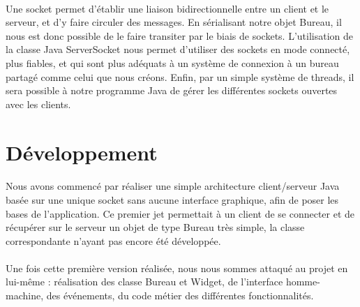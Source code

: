 \paragraph{}
Une socket permet d'établir une liaison bidirectionnelle entre un client et le serveur, et d'y faire circuler des messages. En sérialisant notre objet Bureau, il nous est donc possible de le faire transiter par le biais de sockets. L'utilisation de la classe Java ServerSocket nous permet d'utiliser des sockets en mode connecté, plus fiables, et qui sont plus adéquats à un système de connexion à un bureau partagé comme celui que nous créons. Enfin, par un simple système de threads, il sera possible à notre programme Java de gérer les différentes sockets ouvertes avec les clients.

\section{Développement}

\paragraph{}
Nous avons commencé par réaliser une simple architecture client/serveur Java basée sur une unique socket sans aucune interface graphique, afin de poser les bases de l'application. Ce premier jet permettait à un client de se connecter et de récupérer sur le serveur un objet de type Bureau très simple, la classe correspondante n'ayant pas encore été développée.

\paragraph{}
Une fois cette première version réalisée, nous nous sommes attaqué au projet en lui-même : réalisation des classe Bureau et Widget, de l'interface homme-machine, des événements, du code métier des différentes fonctionnalités. 